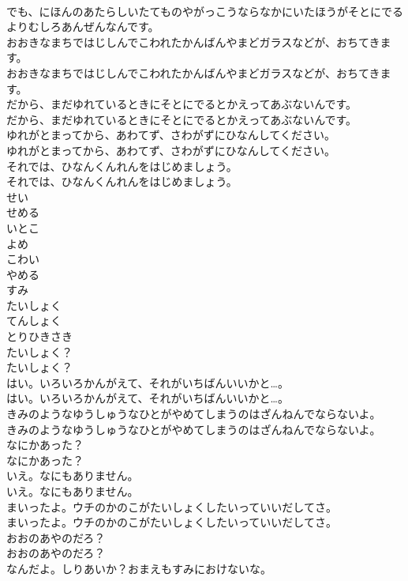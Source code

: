 \documentclass[8pt]{extreport}
\begin{document}
\begin{CJK}{UTF8}{min}
\\	でも、にほんのあたらしいたてものやがっこうならなかにいたほうがそとにでるよりむしろあんぜんなんです。
\\	おおきなまちではじしんでこわれたかんばんやまどガラスなどが、おちてきます。
\\	おおきなまちではじしんでこわれたかんばんやまどガラスなどが、おちてきます。
\\	だから、まだゆれているときにそとにでるとかえってあぶないんです。
\\	だから、まだゆれているときにそとにでるとかえってあぶないんです。
\\	ゆれがとまってから、あわてず、さわがずにひなんしてください。
\\	ゆれがとまってから、あわてず、さわがずにひなんしてください。
\\	それでは、ひなんくんれんをはじめましょう。
\\	それでは、ひなんくんれんをはじめましょう。
\\	せい
\\	せめる
\\	いとこ
\\	よめ
\\	こわい
\\	やめる
\\	すみ
\\	たいしょく
\\	てんしょく
\\	とりひきさき
\\	たいしょく？
\\	たいしょく？
\\	はい。いろいろかんがえて、それがいちばんいいかと…。
\\	はい。いろいろかんがえて、それがいちばんいいかと…。
\\	きみのようなゆうしゅうなひとがやめてしまうのはざんねんでならないよ。
\\	きみのようなゆうしゅうなひとがやめてしまうのはざんねんでならないよ。
\\	なにかあった？
\\	なにかあった？
\\	いえ。なにもありません。
\\	いえ。なにもありません。
\\	まいったよ。ウチのかのこがたいしょくしたいっていいだしてさ。
\\	まいったよ。ウチのかのこがたいしょくしたいっていいだしてさ。
\\	おおのあやのだろ？
\\	おおのあやのだろ？
\\	なんだよ。しりあいか？おまえもすみにおけないな。

\end{CJK}
\end{document}
